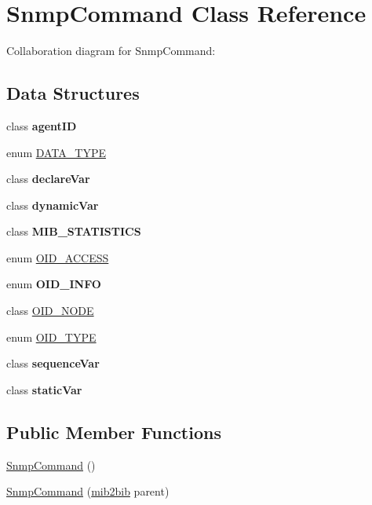 \hypertarget{classmib2bib_1_1_snmp_command}{}\section{Snmp\+Command Class Reference}
\label{classmib2bib_1_1_snmp_command}


Collaboration diagram for Snmp\+Command\+:
\subsection*{Data Structures}
\begin{DoxyCompactItemize}
\item 
class {\bfseries agent\+I\+D}
\item 
enum \hyperlink{enummib2bib_1_1_snmp_command_1_1_d_a_t_a___t_y_p_e}{D\+A\+T\+A\+\_\+\+T\+Y\+P\+E}
\item 
class {\bfseries declare\+Var}
\item 
class {\bfseries dynamic\+Var}
\item 
class {\bfseries M\+I\+B\+\_\+\+S\+T\+A\+T\+I\+S\+T\+I\+C\+S}
\item 
enum \hyperlink{enummib2bib_1_1_snmp_command_1_1_o_i_d___a_c_c_e_s_s}{O\+I\+D\+\_\+\+A\+C\+C\+E\+S\+S}
\item 
enum {\bfseries O\+I\+D\+\_\+\+I\+N\+F\+O}
\item 
class \hyperlink{classmib2bib_1_1_snmp_command_1_1_o_i_d___n_o_d_e}{O\+I\+D\+\_\+\+N\+O\+D\+E}
\item 
enum \hyperlink{enummib2bib_1_1_snmp_command_1_1_o_i_d___t_y_p_e}{O\+I\+D\+\_\+\+T\+Y\+P\+E}
\item 
class {\bfseries sequence\+Var}
\item 
class {\bfseries static\+Var}
\end{DoxyCompactItemize}
\subsection*{Public Member Functions}
\begin{DoxyCompactItemize}
\item 
\hyperlink{classmib2bib_1_1_snmp_command_a2314151510e1182c341ce663ceabdd34}{Snmp\+Command} ()
\item 
\hyperlink{classmib2bib_1_1_snmp_command_a302012a8a4a442a94df40778a16c8f51}{Snmp\+Command} (\hyperlink{classmib2bib_1_1mib2bib}{mib2bib} parent)
\end{DoxyCompactItemize}
